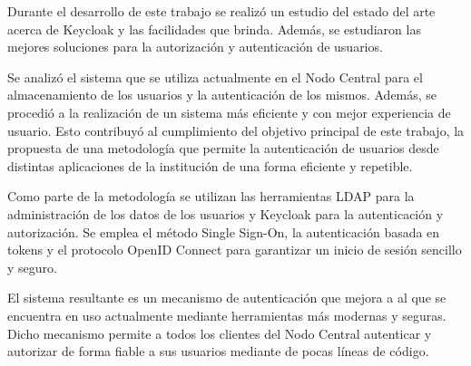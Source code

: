 \begin{conclusions}
    Durante el desarrollo de este trabajo se realizó un estudio del estado del arte acerca de Keycloak y las facilidades que brinda. Además, se estudiaron las mejores soluciones para la autorización y autenticación de usuarios.
    
    Se analizó el sistema que se utiliza actualmente en el Nodo Central para el almacenamiento de los usuarios y la autenticación de los mismos. Además, se procedió a la realización de un sistema más eficiente y con mejor experiencia de usuario. Esto contribuyó al cumplimiento del objetivo principal de este trabajo, la propuesta de una metodología que permite la autenticación de usuarios desde distintas aplicaciones de la institución de una forma eficiente y repetible.
    
    Como parte de la metodología se utilizan las herramientas LDAP para la administración de los datos de los usuarios y Keycloak para la autenticación y autorización. Se emplea el método Single Sign-On, la autenticación basada en tokens y el protocolo OpenID Connect para garantizar un inicio de sesión sencillo y seguro.
    
    El sistema resultante es un mecanismo de autenticación que mejora a al que se encuentra en uso actualmente mediante herramientas más modernas y seguras. Dicho mecanismo permite a todos los clientes del Nodo Central autenticar y autorizar de forma fiable a sus usuarios mediante de pocas líneas de código.
\end{conclusions}
